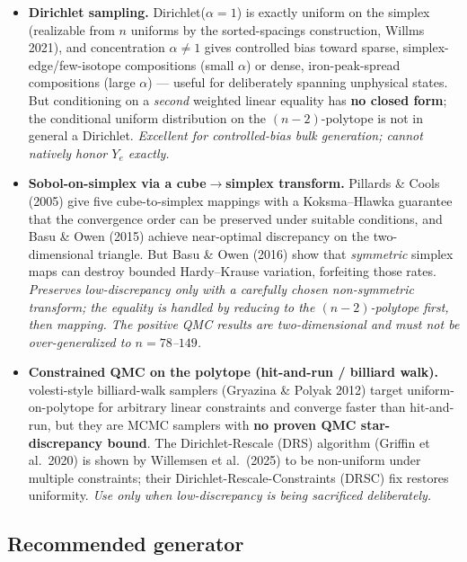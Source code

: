 \documentclass[11pt]{article}
\begin{document}
\begin{itemize}
\item \textbf{Dirichlet sampling.} Dirichlet($\alpha = 1$) is exactly uniform on the simplex (realizable from $n$ uniforms by the sorted-spacings construction, Willms 2021), and concentration $\alpha \neq 1$ gives controlled bias toward sparse, simplex-edge/few-isotope compositions (small $\alpha$) or dense, iron-peak-spread compositions (large $\alpha$) --- useful for deliberately spanning unphysical states. But conditioning on a \emph{second} weighted linear equality has \textbf{no closed form}; the conditional uniform distribution on the $(n-2)$-polytope is not in general a Dirichlet. \emph{Excellent for controlled-bias bulk generation; cannot natively honor $Y_e$ exactly.}
\item \textbf{Sobol-on-simplex via a cube$\to$simplex transform.} Pillards \& Cools (2005) give five cube-to-simplex mappings with a Koksma--Hlawka guarantee that the convergence order can be preserved under suitable conditions, and Basu \& Owen (2015) achieve near-optimal discrepancy on the two-dimensional triangle. But Basu \& Owen (2016) show that \emph{symmetric} simplex maps can destroy bounded Hardy--Krause variation, forfeiting those rates. \emph{Preserves low-discrepancy only with a carefully chosen non-symmetric transform; the equality is handled by reducing to the $(n-2)$-polytope first, then mapping. The positive QMC results are two-dimensional and must not be over-generalized to $n = 78$--$149$.}
\item \textbf{Constrained QMC on the polytope (hit-and-run / billiard walk).} volesti-style billiard-walk samplers (Gryazina \& Polyak 2012) target uniform-on-polytope for arbitrary linear constraints and converge faster than hit-and-run, but they are MCMC samplers with \textbf{no proven QMC star-discrepancy bound}. The Dirichlet-Rescale (DRS) algorithm (Griffin et al.\ 2020) is shown by Willemsen et al.\ (2025) to be non-uniform under multiple constraints; their Dirichlet-Rescale-Constraints (DRSC) fix restores uniformity. \emph{Use only when low-discrepancy is being sacrificed deliberately.}
\end{itemize}

\subsection{Recommended generator}
\end{document}
